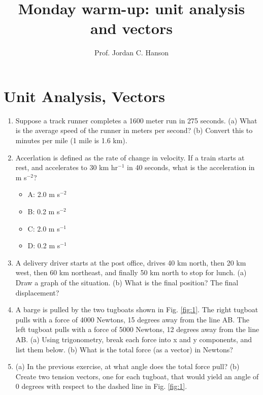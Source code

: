 \documentclass{article}
\begin{document}
\twocolumn

\title{Monday warm-up: unit analysis and vectors}
\author{Prof. Jordan C. Hanson}

\maketitle

\section{Unit Analysis, Vectors}

\begin{enumerate}
\item Suppose a track runner completes a 1600 meter run in 275 seconds.  (a) What is the average speed of the runner in meters per second? (b) Convert this to minutes per mile (1 mile is 1.6 km). \\ \vspace{2cm}
\item Accerlation is defined as the rate of change in velocity.  If a train starts at rest, and accelerates to 30 km hr$^{-1}$ in 40 seconds,  what is the acceleration in m s$^{-2}$? 
\begin{itemize}
\item A: 2.0 m s$^{-2}$
\item B: 0.2 m s$^{-2}$
\item C: 2.0 m s$^{-1}$
\item D: 0.2 m s$^{-1}$
\end{itemize}
\item A delivery driver starts at the post office, drives 40 km north, then 20 km west, then 60 km northeast, and finally 50 km north to stop for lunch. (a) Draw a graph of the situation. (b) What is the final position?  The final displacement? \\ \vspace{3cm}
\item A barge is pulled by the two tugboats shown in Fig. \ref{fig:1}. The right tugboat pulls with a force of 4000 Newtons, 15 degrees away from the line AB.  The left tugboat pulls with a force of 5000 Newtons, 12 degrees away from the line AB.  (a) Using trigonometry, break each force into x and y components, and list them below.  (b) What is the total force (as a vector) in Newtons? \\ \vspace{3cm}
\item (a) In the previous exercise, at what angle does the total force pull? (b) Create two tension vectors, one for each tugboat, that would yield an angle of 0 degrees with respect to the dashed line in Fig. \ref{fig:1}.  \\ \vspace{3cm}
\end{enumerate}
\end{document}
